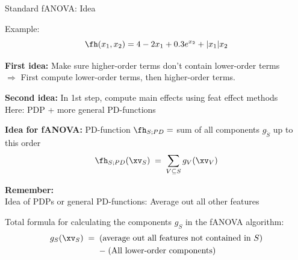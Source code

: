 \documentclass[10pt,compress,t,notes=noshow, xcolor=table]{beamer}
\begin{document}
\begin{framei}[align=top]{Standard fANOVA: Idea}
\item Example:
$$
\fh(x_1, x_2) = 4 - 2x_1 + 0.3 e^{x_2} + |x_1|x_2
$$
\pause
\item \textbf{First idea:} Make sure higher-order terms don't contain lower-order terms \\
$\Rightarrow$ First compute lower-order terms, then higher-order terms. \\
\pause
\item \textbf{Second idea:} In 1st step, compute main effects using feat effect methods \\
Here: PDP + more general PD-functions
\pause
\item \textbf{Idea for fANOVA:} PD-function $\fh_{S;PD} =$ sum of all components $g_{\tilde{S}}$ up to this order
$$
\fh_{S;PD}(\xv_S) \; = \; \sum_{V \subseteq S} g_{V}(\xv_V)
$$
\pause
\item \textbf{Remember:} \\ Idea of PDPs or general PD-functions: Average out all other features
\item[$\Rightarrow$] Total formula for calculating the components $g_S$ in the fANOVA algorithm:
\begin{multline*}
g_{S} (\xv_S)
\;=\; (\text{average out all features not contained in } S) \\
\;-\; (\text{All lower-order components})
\end{multline*}
\end{framei}
\end{document}
